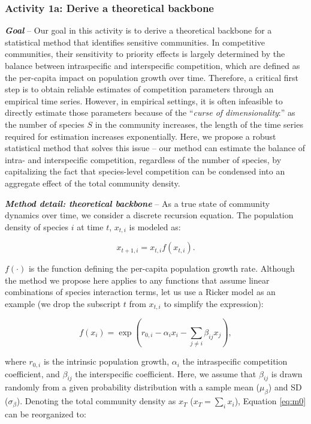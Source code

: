 \documentclass[12pt, class=article, crop=false]{standalone}
\begin{document}
\subsubsection*{Activity 1a: Derive a theoretical backbone}

\textbf{\textit{Goal}} -- 
Our goal in this activity is to derive a theoretical backbone for a statistical method that identifies sensitive communities.
In competitive communities, their sensitivity to priority effects is largely determined by the balance between intraspecific and interspecific competition, which are defined as the per-capita impact on population growth over time.
Therefore, a critical first step is to obtain reliable estimates of competition parameters through an empirical time series.
However, in empirical settings, it is often infeasible to directly estimate those parameters because of the ``\textit{curse of dimensionality}:'' as the number of species $S$ in the community increases, the length of the time series required for estimation increases exponentially.
Here, we propose a robust statistical method that solves this issue -- our method can estimate the balance of intra- and interspecific competition, regardless of the number of species, by capitalizing the fact that species-level competition can be condensed into an aggregate effect of the total community density.

\textbf{\textit{Method detail: theoretical backbone}} -- 
As a true state of community dynamics over time, we consider a discrete recursion equation. The population density of species $i$ at time $t$, $x_{t,i}$ is modeled as:

\begin{equation}
\label{eq:m0}
x_{t + 1, i} = x_{t, i} f(x_{t, i}).
\end{equation}

$f(\cdot)$ is the function defining the per-capita population growth rate.
Although the method we propose here applies to any functions that assume linear combinations of species interaction terms, let us use a Ricker model as an example (we drop the subscript $t$ from $x_{t,i}$ to simplify the expression):

\begin{equation}
\label{eq:ricker}
f(x_{i}) = \exp(r_{0,i} - \alpha_i x_i - \sum_{j \ne i} \beta_{ij} x_{j}),
\end{equation}

where $r_{0,i}$ is the intrinsic population growth, $\alpha_{i}$ the intraspecific competition coefficient, and $\beta_{ij}$ the interspecific coefficient.
Here, we assume that $\beta_{ij}$ is drawn randomly from a given probability distribution with a sample mean ($\mu_{\beta}$) and SD ($\sigma_{\beta}$). 
Denoting the total community density as $x_T$ ($x_T = \sum_i x_i$), Equation \ref{eq:m0} can be reorganized to:
\end{document}
